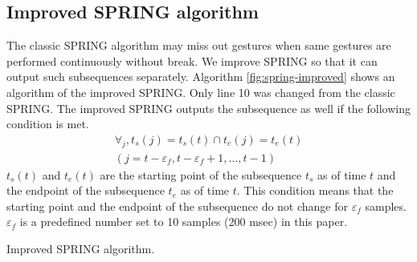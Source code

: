 \documentclass{sigchi-ext}
\begin{document}
        \subsection{Improved SPRING algorithm}
        The classic SPRING algorithm may miss out gestures when same gestures are performed continuously without break. We improve SPRING so that it can output such subsequences separately. Algorithm \ref{fig:spring-improved} shows an algorithm of the improved SPRING. Only line 10 was changed from the classic SPRING. The improved SPRING outputs the subsequence as well if the following condition is met.
        \begin{eqnarray}
            \label{eq:force}
            \forall_{j}, t_s(j) = t_s(t) \cap t_e(j) = t_e(t) \\
            (j = t-\varepsilon_{f}, t-\varepsilon_{f}+1, \dots, t-1) \nonumber
        \end{eqnarray}
        $t_{s}(t)$ and $t_{e}(t)$ are the starting point of the subsequence $t_s$ as of time $t$ and the endpoint of the subsequence $t_e$ as of time $t$. 
        This condition means that the starting point and the endpoint of the subsequence do not change for $\varepsilon_{f}$ samples. $\varepsilon_{f}$ is a predefined number set to 10 samples (200 msec) in this paper.
        
        \begin{algorithm}[!t]
            \begin{algorithmic}[1]
                \EndFor
                \EndIf
                \EndFor
                \EndIf
                \EndIf
                \EndIf
                \EndFor
            \end{algorithmic}
            \caption{Improved SPRING algorithm.}\label{fig:spring-improved}
        \end{algorithm}
       
\end{document}
